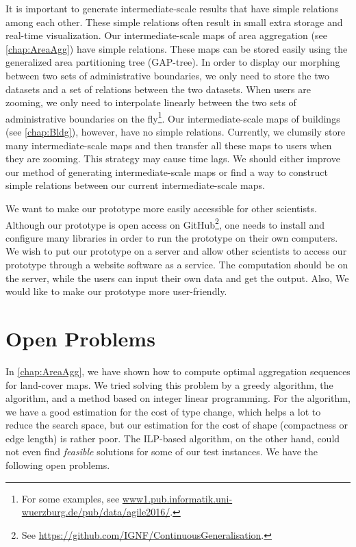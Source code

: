 It is important to generate intermediate-scale results 
that have simple relations among each other.
These simple relations often result in 
small extra storage and real-time visualization.
Our intermediate-scale maps of area aggregation 
(see \chap\ref{chap:AreaAgg}) 
have simple relations.
These maps can be stored easily
using the generalized area partitioning tree (GAP-tree).
In order to display our morphing between 
two sets of administrative boundaries, 
we only need to store the two datasets 
and a set of relations between the two datasets. 
When users are zooming,
we only need to interpolate linearly between 
the two sets of administrative boundaries 
on the fly\footnote{For some examples, see 
\url{www1.pub.informatik.uni-wuerzburg.de/pub/data/agile2016/}.}.
Our intermediate-scale maps of buildings 
(see \chap\ref{chap:Bldg}), 
however, have no simple relations.
Currently, we clumsily store many intermediate-scale maps
and then transfer all these maps to users when they are zooming.
This strategy may cause time lags.
We should either improve our method of generating 
intermediate-scale maps 
or find a way to construct simple relations 
between our current intermediate-scale maps.

We want to make our prototype more easily accessible 
for other scientists.
Although our prototype is open access on GitHub\footnote{See 
\url{https://github.com/IGNF/ContinuousGeneralisation}.},
one needs to install and configure many libraries in order to 
run the prototype on their own computers.
We wish to put our prototype on a server and allow 
other scientists to access our prototype through a website
software as a service.
The computation should be on the server,
while the users can input their own data and get the output.
Also, We would like to make our prototype more user-friendly.

\section{Open Problems}

In \chap\ref{chap:AreaAgg}, 
we have shown how to compute optimal
aggregation sequences for %
land-cover maps.
We tried solving this problem by a greedy algorithm,
the \Astar algorithm,
and a method based on integer linear programming.
For the \Astar algorithm, 
we have a good estimation for the cost of type change, 
which helps a lot to reduce the search space, 
but our estimation for the cost of shape 
(compactness or edge length) is rather poor.
The ILP-based algorithm, on the other hand, 
could not even find \emph{feasible} solutions 
for some of our test instances.
We have the following open problems.
 
